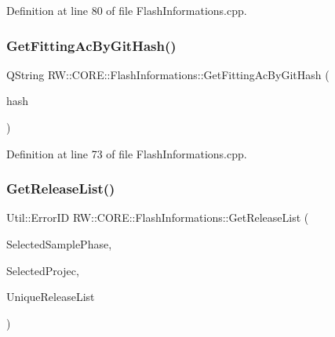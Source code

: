 Definition at line 80 of file Flash\+Informations.\+cpp.

\hypertarget{class_r_w_1_1_c_o_r_e_1_1_flash_informations_a54a1ad5f711dd80d570e1d93ae205bd3}{}\label{class_r_w_1_1_c_o_r_e_1_1_flash_informations_a54a1ad5f711dd80d570e1d93ae205bd3} 
\subsubsection{\texorpdfstring{Get\+Fitting\+Ac\+By\+Git\+Hash()}{GetFittingAcByGitHash()}}
{\footnotesize\ttfamily Q\+String R\+W\+::\+C\+O\+R\+E\+::\+Flash\+Informations\+::\+Get\+Fitting\+Ac\+By\+Git\+Hash (\begin{DoxyParamCaption}\item[{Q\+String}]{hash }\end{DoxyParamCaption})\hspace{0.3cm}{\ttfamily [private]}}



Definition at line 73 of file Flash\+Informations.\+cpp.

\hypertarget{class_r_w_1_1_c_o_r_e_1_1_flash_informations_affbc5dd5c41a1417a33ec5490d2b1875}{}\label{class_r_w_1_1_c_o_r_e_1_1_flash_informations_affbc5dd5c41a1417a33ec5490d2b1875} 
\subsubsection{\texorpdfstring{Get\+Release\+List()}{GetReleaseList()}}
{\footnotesize\ttfamily Util\+::\+Error\+ID R\+W\+::\+C\+O\+R\+E\+::\+Flash\+Informations\+::\+Get\+Release\+List (\begin{DoxyParamCaption}\item[{Q\+String}]{Selected\+Sample\+Phase,  }\item[{Q\+String}]{Selected\+Projec,  }\item[{Q\+List$<$ Q\+String $>$ \&}]{Unique\+Release\+List }\end{DoxyParamCaption})}



